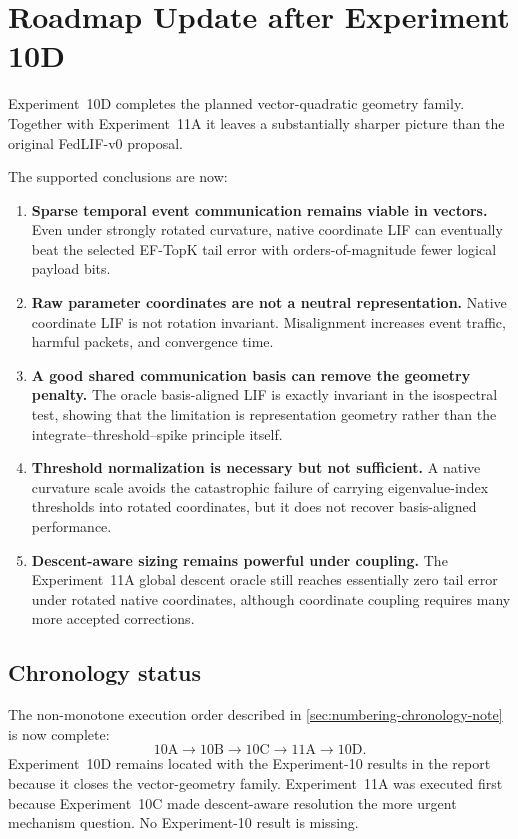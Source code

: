 \section{Roadmap Update after Experiment 10D}
\label{sec:roadmap-post-10d}

Experiment~10D completes the planned vector-quadratic geometry family. Together with Experiment~11A it leaves a substantially sharper picture than the original FedLIF-v0 proposal.

The supported conclusions are now:
\begin{enumerate}
  \item \textbf{Sparse temporal event communication remains viable in vectors.} Even under strongly rotated curvature, native coordinate LIF can eventually beat the selected EF-TopK tail error with orders-of-magnitude fewer logical payload bits.
  \item \textbf{Raw parameter coordinates are not a neutral representation.} Native coordinate LIF is not rotation invariant. Misalignment increases event traffic, harmful packets, and convergence time.
  \item \textbf{A good shared communication basis can remove the geometry penalty.} The oracle basis-aligned LIF is exactly invariant in the isospectral test, showing that the limitation is representation geometry rather than the integrate--threshold--spike principle itself.
  \item \textbf{Threshold normalization is necessary but not sufficient.} A native curvature scale avoids the catastrophic failure of carrying eigenvalue-index thresholds into rotated coordinates, but it does not recover basis-aligned performance.
  \item \textbf{Descent-aware sizing remains powerful under coupling.} The Experiment~11A global descent oracle still reaches essentially zero tail error under rotated native coordinates, although coordinate coupling requires many more accepted corrections.
\end{enumerate}

\subsection{Chronology status}

The non-monotone execution order described in \cref{sec:numbering-chronology-note} is now complete:
\begin{equation}
  10\mathrm{A}\rightarrow10\mathrm{B}\rightarrow10\mathrm{C}\rightarrow11\mathrm{A}\rightarrow10\mathrm{D}.
\end{equation}
Experiment~10D remains located with the Experiment-10 results in the report because it closes the vector-geometry family. Experiment~11A was executed first because Experiment~10C made descent-aware resolution the more urgent mechanism question. No Experiment-10 result is missing.

